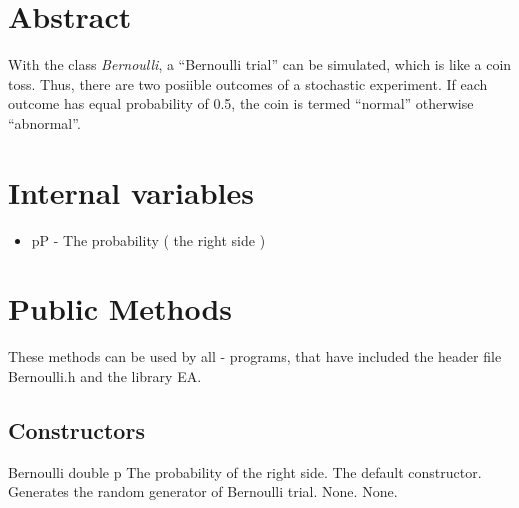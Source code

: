 %

\section{Abstract}

\noindent
With the class {\em Bernoulli}, a ``Bernoulli trial'' can be
simulated, which is like a coin toss. Thus, there are two posiible
outcomes of a stochastic experiment. If each outcome has equal
probability of 0.5, the coin is termed ``normal'' otherwise
``abnormal''. 

\vspace*{10mm}

\section{Internal variables}

\begin{itemize}
\item {pP - The probability ( the right side )}
\end{itemize}


\vspace*{10mm}

\section{Public Methods}

\noindent
These methods can be used by all \cpp - programs, that have included the
header file Bernoulli.h and the library EA.

\subsection{Constructors}

\setNormalInstance
\printMethodWithOneParam
{}
{Bernoulli}
{double}
{p}
{The probability of the right side.}
{The default constructor. Generates the random generator of Bernoulli trial.}
{None.}
{None.}

